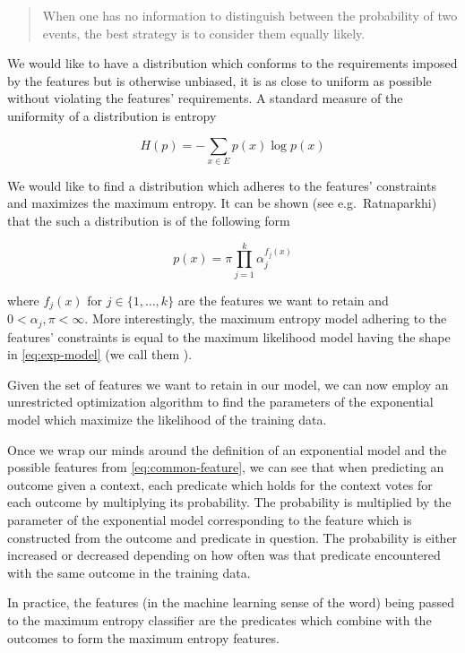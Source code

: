 \begin{quote}
When one has no information to distinguish between the probability of two
events, the best strategy is to consider them equally likely.
\end{quote}

We would like to have a distribution which conforms to the requirements imposed
by the features but is otherwise unbiased, it is as close to uniform as
possible without violating the features' requirements. A standard measure of
the uniformity of a distribution is entropy

\[
H(p) = -\sum_{x \in E} p(x) \log p(x)
\]

We would like to find a distribution which adheres to the features' constraints
and maximizes the maximum entropy. It can be shown (see e.g.\ Ratnaparkhi) that
the such a distribution is of the following form

\begin{equation}
\label{eq:exp-model}
p(x) = \pi \prod_{j=1}^k \alpha_j^{f_j(x)}
\end{equation}

where $f_j(x)$ for $j \in \{1,\dotsc,k\}$ are the features we want to retain
and $0 < \alpha_j,\pi < \infty$. More interestingly, the maximum entropy model
adhering to the features' constraints is equal to the maximum likelihood model
having the shape in \ref{eq:exp-model} (we call them ). 

Given the set of features we want to retain in our model, we can now employ an
unrestricted optimization algorithm to find the parameters of the exponential
model which maximize the likelihood of the training data.

Once we wrap our minds around the definition of an exponential model and the
possible features from \ref{eq:common-feature}, we can see that when predicting
an outcome given a context, each predicate which holds for the context votes
for each outcome by multiplying its probability. The probability is multiplied
by the parameter of the exponential model corresponding to the feature which
is constructed from the outcome and predicate in question. The probability is
either increased or decreased depending on how often was that predicate
encountered with the same outcome in the training data.

In practice, the features (in the machine learning sense of the word) being
passed to the maximum entropy classifier are the predicates which combine with
the outcomes to form the maximum entropy features.


